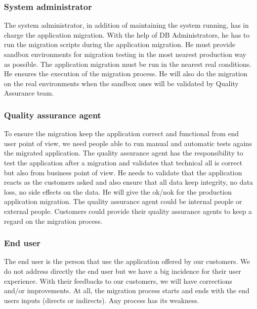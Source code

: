 \subsubsection{System administrator\\}

The system administrator, in addition of maintaining the system running, has in charge the application migration. With the help of DB Administrators, he has to run the migration scripts during the application migration. He must provide sandbox environments for migration testing in the most nearest production way as possible. The application migration must be run in the nearest real conditions. He ensures the execution of the migration process. He will also do the migration on the real environments when the sandbox ones will be validated by Quality Assurance team.

\subsubsection{Quality assurance agent\\}

To ensure the migration keep the application correct and functional from end user point of view, we need people able to run manual and automatic tests agains the migrated application. The quality assurance agent has the responsibility to test the application after a migration and validates that technical all is correct but also from business point of view. He needs to validate that the application reacts as the customers asked and also ensure that all data keep integrity, no data loss, no side effects on the data. He will give the ok/nok for the production application migration. The quality assurance agent could be internal people or external people. Customers could provide their quality assurance agents to keep a regard on the migration process.

\subsubsection{End user\\}

The end user is the person that use the application offered by our customers. We do not address directly the end user but we have a big incidence for their user experience. With their feedbacks to our customers, we will have corrections and/or improvements. At all, the migration process starts and ends with the end users inputs (directs or indirects). Any process has its weakness. 

